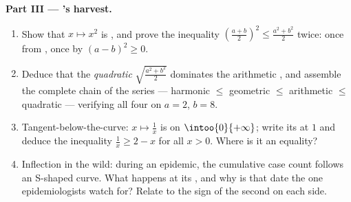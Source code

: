 \begin{problem}
\medskip
\noindent\textbf{Part III --- 's harvest.}
\begin{enumerate}[resume]
  \item Show that $x \mapsto x^2$ is , and prove the
         inequality
        $\left(\frac{a + b}{2}\right)^2 \leq
        \frac{a^2 + b^2}{2}$ twice: once from , once
        by  $(a - b)^2 \geq 0$.
  \item Deduce that the \emph{quadratic }
        $\sqrt{\frac{a^2 + b^2}{2}}$ dominates the arithmetic
        , and assemble the complete chain of the series ---
        harmonic $\leq$ geometric $\leq$ arithmetic $\leq$
        quadratic --- verifying all four on $a = 2$, $b = 8$.
  \item Tangent-below-the-curve: $x \mapsto \frac1x$ is 
        on $\intoo{0}{+\infty}$; write its  at $1$ and
        deduce the inequality
        $\frac1x \geq 2 - x$ for all $x > 0$. Where is it an
        equality?
  \item Inflection in the wild: during an epidemic, the
        cumulative case count follows an S-shaped curve. What
        happens at its , and why is that date
        the one epidemiologists watch for? Relate to the sign
        of the second  on each side.
\end{enumerate}


\end{problem}
